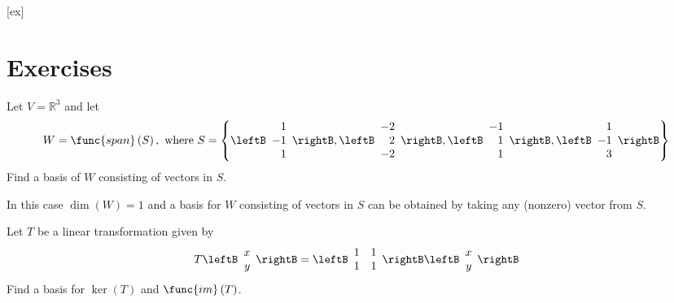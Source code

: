 [ex]
\section*{Exercises}

\begin{enumialphparenastyle}

\begin{ex}
Let $V=\mathbb{R}^{3}$ and let 
\begin{equation*}
W=\func{span} \left( S \right),  \mbox{ where } S=\left\{ \leftB 
\begin{array}{r}
1 \\ 
-1 \\ 
1
\end{array}
\rightB ,\leftB 
\begin{array}{r}
-2 \\ 
2 \\ 
-2
\end{array}
\rightB,\leftB 
\begin{array}{r}
-1 \\ 
1 \\ 
1
\end{array}
\rightB,\leftB 
\begin{array}{r}
1 \\ 
-1 \\ 
3
\end{array}
\rightB \right\}
\end{equation*}
Find a basis of $W$ consisting of vectors in $S$. 

\begin{sol}
In this case $\dim (W)=1$ and a basis for $W$ consisting of vectors in $S$ can be obtained by taking any (nonzero) vector from $S$. 
\end{sol}
\end{ex}


\begin{ex}
 Let $T$ be a linear transformation given by 
\[
T \leftB \begin{array}{r}
x\\
y
\end{array}\rightB = \leftB \begin{array}{rrr}
1 &1  \\
1 & 1
\end{array}\rightB
\leftB \begin{array}{r}
x\\
y
\end{array}\rightB
\]
Find a basis for $\ker \left( T\right)$ and $\func{im} \left( T\right) $.


\end{ex}
\end{enumialphparenastyle}
